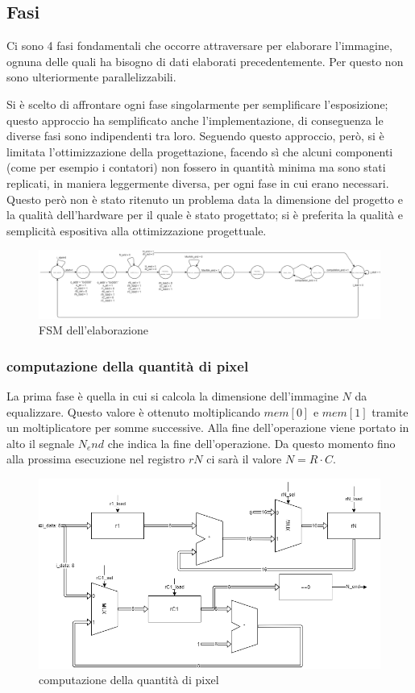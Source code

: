 \documentclass[11pt]{article} %
\begin{document}
\subsection{Fasi}
Ci sono 4 fasi fondamentali che occorre attraversare per elaborare l'immagine, ognuna delle quali ha bisogno di dati elaborati precedentemente. Per questo non sono ulteriormente parallelizzabili.

Si è scelto di affrontare ogni fase singolarmente per semplificare l'esposizione; questo approccio ha semplificato anche l'implementazione, di conseguenza le diverse fasi sono indipendenti tra loro. Seguendo questo approccio, però, si è limitata l'ottimizzazione della progettazione, facendo sì che alcuni componenti (come per esempio i contatori) non fossero in quantità minima ma sono stati replicati, in maniera leggermente diversa, per ogni fase in cui erano necessari. Questo però non è stato ritenuto un problema data la dimensione del progetto e la qualità dell'hardware per il quale è stato progettato; si è preferita la qualità e semplicità espositiva alla ottimizzazione progettuale.

\begin{figure}[h]
\centering
\includegraphics[width=150mm]{datapaths/FSM.png}
\caption{FSM dell'elaborazione}
\end{figure}

\subsubsection{computazione della quantità di pixel}
La prima fase è quella in cui si calcola la dimensione dell'immagine $N$ da equalizzare. Questo valore è ottenuto moltiplicando $mem[0]$ e $mem[1]$ tramite un moltiplicatore per somme successive. Alla fine dell'operazione viene portato in alto il segnale $N_end$ che indica la fine dell'operazione. Da questo momento fino alla prossima esecuzione nel registro $rN$ ci sarà il valore $N = R \cdot C$.

\begin{figure}[h]
\centering
\includegraphics[width=120mm]{datapaths/regN.png}
\caption{computazione della quantità di pixel}
\end{figure}
\end{document}
